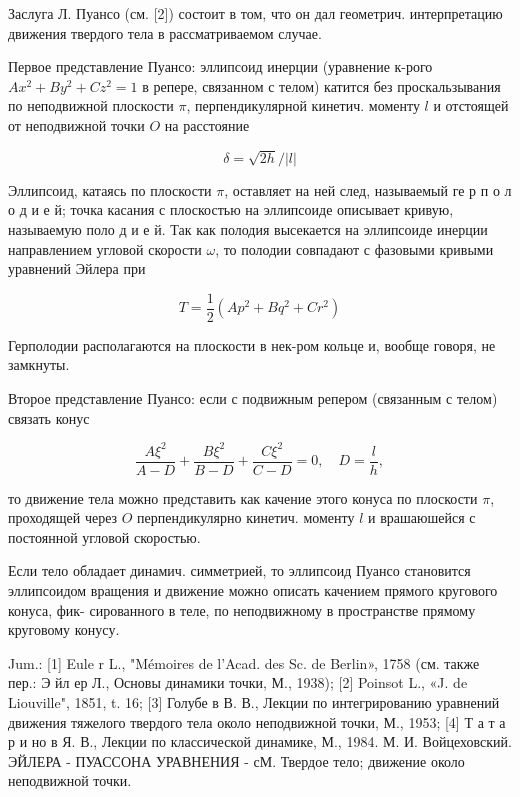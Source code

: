 \documentclass[10pt]{article}
\begin{document}
Заслуга Л. Пуансо (см. [2]) состоит в том, что он дал геометрич. интерпретацию движения твердого тела в рассматриваемом случае.



Первое представление Пуансо: эллипсоид инерции (уравнение к-рого $A x^{2}+B y^{2}+C z^{2}=1$ в репере, связанном с телом) катится без проскальзывания по неподвижной плоскости $\pi$, перпендикулярной кинетич. моменту $l$ и отстоящей от неподвижной точки $O$ на расстояние



\[

\delta=\sqrt{2 h} /|l|

\]



Эллипсоид, катаясь по плоскости $\pi$, оставляет на ней след, называемый ге р п о л о д и е й; точка касания с плоскостью на эллипсоиде описывает кривую, называемую поло д и е й. Так как полодия высекается на эллипсоиде инерции направлением угловой скорости $\omega$, то полодии совпадают с фазовыми кривыми уравнений Эйлера при



\[

T=\frac{1}{2}\left(A p^{2}+B q^{2}+C r^{2}\right)

\]



Герполодии располагаются на плоскости в нек-ром кольце и, вообще говоря, не замкнуты.



Второе представление Пуансо: если с подвижным репером (связанным с телом) связать конус



\[

\frac{A \xi^{2}}{A-D}+\frac{B \xi^{2}}{B-D}+\frac{C \xi^{2}}{C-D}=0, \quad D=\frac{l}{h},

\]



то движение тела можно представить как качение этого конуса по плоскости $\pi$, проходящей через $O$ перпендикулярно кинетич. моменту $l$ и врашаюшейся с постоянной угловой скоростью.



Если тело обладает динамич. симметрией, то эллипсоид Пуансо становится эллипсоидом вращения и движение можно описать качением прямого кругового конуса, фик- сированного в теле, по неподвижному в пространстве прямому круговому конусу.



Jum.: [1] Eule r L., "Mémoires de l'Acad. des Sc. de Berlin», 1758 (см. также пер.: Э йл ер Л., Основы динамики точки, М., 1938); [2] Poinsot L., «J. de Liouville", 1851, t. 16; [3] Голубе в В. В., Лекции по интегрированию уравнений движения тяжелого твердого тела около неподвижной точки, М., 1953; [4] Т а т а р и но в Я. В., Лекции по классической динамике, М., 1984. М. И. Войцеховский. ЭЙЛЕРА - ПУАССОНА УРАВНЕНИЯ - сМ. Твердое тело; движение около неподвижной точки.
\end{document}
